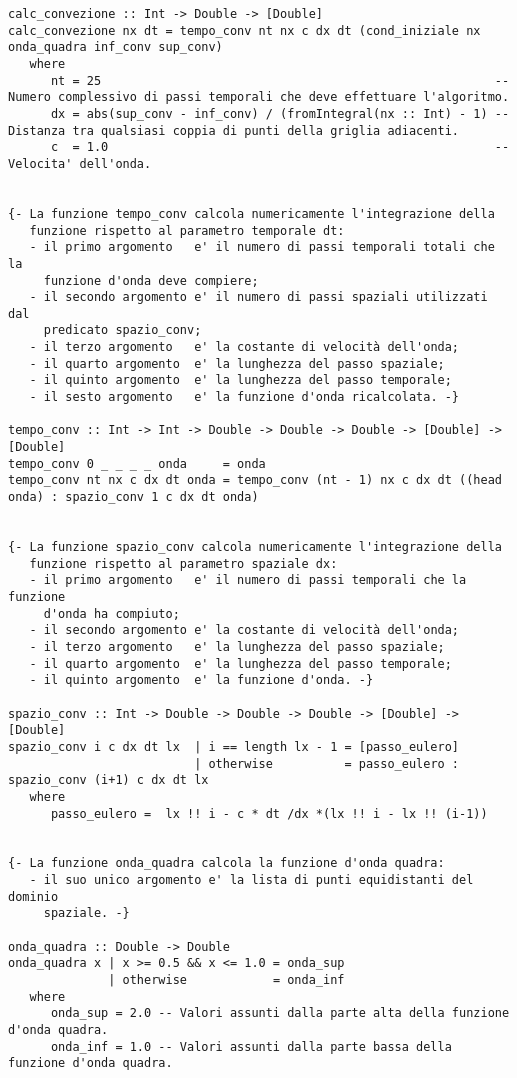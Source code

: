 \begin{verbatim}
calc_convezione :: Int -> Double -> [Double]
calc_convezione nx dt = tempo_conv nt nx c dx dt (cond_iniziale nx onda_quadra inf_conv sup_conv)
   where
      nt = 25                                                       -- Numero complessivo di passi temporali che deve effettuare l'algoritmo.
      dx = abs(sup_conv - inf_conv) / (fromIntegral(nx :: Int) - 1) -- Distanza tra qualsiasi coppia di punti della griglia adiacenti.
      c  = 1.0                                                      -- Velocita' dell'onda.


{- La funzione tempo_conv calcola numericamente l'integrazione della
   funzione rispetto al parametro temporale dt:
   - il primo argomento   e' il numero di passi temporali totali che la
     funzione d'onda deve compiere; 
   - il secondo argomento e' il numero di passi spaziali utilizzati dal
     predicato spazio_conv;
   - il terzo argomento   e' la costante di velocità dell'onda;     
   - il quarto argomento  e' la lunghezza del passo spaziale;
   - il quinto argomento  e' la lunghezza del passo temporale;
   - il sesto argomento   e' la funzione d'onda ricalcolata. -}

tempo_conv :: Int -> Int -> Double -> Double -> Double -> [Double] -> [Double]
tempo_conv 0 _ _ _ _ onda     = onda
tempo_conv nt nx c dx dt onda = tempo_conv (nt - 1) nx c dx dt ((head onda) : spazio_conv 1 c dx dt onda) 


{- La funzione spazio_conv calcola numericamente l'integrazione della
   funzione rispetto al parametro spaziale dx:
   - il primo argomento   e' il numero di passi temporali che la funzione
     d'onda ha compiuto;
   - il secondo argomento e' la costante di velocità dell'onda;      
   - il terzo argomento   e' la lunghezza del passo spaziale;
   - il quarto argomento  e' la lunghezza del passo temporale;
   - il quinto argomento  e' la funzione d'onda. -}

spazio_conv :: Int -> Double -> Double -> Double -> [Double] -> [Double] 
spazio_conv i c dx dt lx  | i == length lx - 1 = [passo_eulero]
                          | otherwise          = passo_eulero : spazio_conv (i+1) c dx dt lx
   where
      passo_eulero =  lx !! i - c * dt /dx *(lx !! i - lx !! (i-1))


{- La funzione onda_quadra calcola la funzione d'onda quadra:
   - il suo unico argomento e' la lista di punti equidistanti del dominio
     spaziale. -}

onda_quadra :: Double -> Double
onda_quadra x | x >= 0.5 && x <= 1.0 = onda_sup
              | otherwise            = onda_inf
   where
      onda_sup = 2.0 -- Valori assunti dalla parte alta della funzione d'onda quadra.
      onda_inf = 1.0 -- Valori assunti dalla parte bassa della funzione d'onda quadra.



\end{verbatim}
